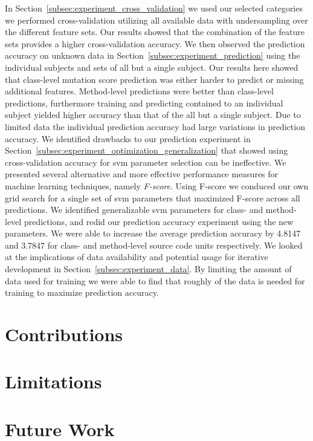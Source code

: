 In Section~\ref{subsec:experiment_cross_validation} we used our selected categories we performed cross-validation utilizing all available data with undersampling over the different feature sets. Our results showed that the combination of the feature sets provides a higher cross-validation accuracy. We then observed the prediction accuracy on unknown data in Section~\ref{subsec:experiment_prediction} using the individual subjects and sets of all but a single subject. Our results here showed that class-level mutation score prediction was either harder to predict or missing additional features. Method-level predictions were better than class-level predictions, furthermore training and predicting contained to an individual subject yielded higher accuracy than that of the all but a single subject. Due to limited data the individual prediction accuracy had large variations in prediction accuracy. We identified drawbacks to our prediction experiment in Section~\ref{subsec:experiment_optimization_generalization} that showed using cross-validation accuracy for \gls{svm} parameter selection can be ineffective. We presented several alternative and more effective performance measures for machine learning techniques, namely \emph{F-score}. Using F-score we conduced our own grid search for a single set of \gls{svm} parameters that maximized F-score across all predictions. We identified generalizable \gls{svm} parameters for class- and method-level predictions, and redid our prediction accuracy experiment using the new parameters. We were able to increase the average prediction accuracy by 4.8147 and 3.7847 for class- and method-level source code units respectively. We looked at the implications of data availability and potential usage for iterative development in Section~\ref{subsec:experiment_data}. By limiting the amount of data used for training we were able to find that roughly  of the data is needed for training to maximize prediction accuracy. 


\section{Contributions}
\label{sec:conclusions_contributions}


\section{Limitations}
\label{sec:conclusions_limitations}


\section{Future Work}
\label{sec:conclusions_future_work}


